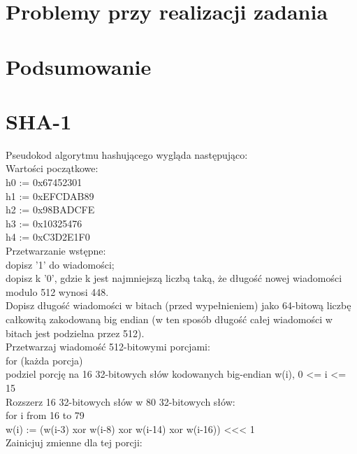 \documentclass[oneside]{mgr}
\begin{document}
\chapter{Problemy przy realizacji zadania}

\chapter{Podsumowanie}
\appendix
\chapter{SHA-1}
Pseudokod algorytmu hashującego wygląda następująco:\\
Wartości początkowe:\\
\hspace*{10mm}h0 := 0x67452301\\
\hspace*{10mm}h1 := 0xEFCDAB89\\
\hspace*{10mm}h2 := 0x98BADCFE\\
\hspace*{10mm}h3 := 0x10325476\\
\hspace*{10mm}h4 := 0xC3D2E1F0\\
Przetwarzanie wstępne:\\
dopisz '1' do wiadomości;\\
dopisz k '0', gdzie k jest najmniejszą liczbą taką, że długość nowej wiadomości modulo 512 wynosi 448.\\
Dopisz długość wiadomości w bitach (przed wypełnieniem) jako 64-bitową liczbę całkowitą zakodowaną big endian (w ten sposób długość całej wiadomości w bitach jest podzielna przez 512).\\
Przetwarzaj wiadomość 512-bitowymi porcjami:\\
for (każda porcja)\\
\hspace*{10mm}podziel porcję na 16 32-bitowych słów kodowanych big-endian w(i), 0 <= i <= 15\\
\hspace*{10mm}Rozszerz 16 32-bitowych słów w 80 32-bitowych słów:\\
\hspace*{10mm}for i from 16 to 79\\
\hspace*{20mm}w(i) := (w(i-3) xor w(i-8) xor w(i-14) xor w(i-16)) <<< 1\\
\hspace*{10mm}Zainicjuj zmienne dla tej porcji:\\
\end{document}
